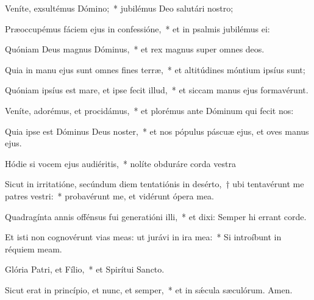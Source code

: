 \item Veníte, exsultémus Dómino;~* jubilémus Deo salutári nostro;

\item Præoccupémus fáciem ejus in confessióne,~* et in psalmis jubilémus ei: 

\item Quóniam Deus magnus Dóminus,~* et rex magnus super omnes deos.

\item Quia in manu ejus sunt omnes fines terræ,~* et altitúdines móntium ipsíus sunt; 

\item Quóniam ipsíus est mare, et ipse fecit illud,~* et siccam manus ejus formavérunt.

\item Veníte, adorémus, et procidámus,~* et plorémus ante Dóminum qui fecit nos:

\item Quia ipse est Dóminus Deus noster,~* et nos pópulus páscuæ ejus, et oves manus ejus. 

\item Hódie si vocem ejus audiéritis,~* nolíte obduráre corda vestra

\item Sicut in irritatióne, secúndum diem tentatiónis in desérto,~† ubi tentavérunt me patres vestri:~* probavérunt me, et vidérunt ópera mea. 

\item Quadragínta annis offénsus fui generatióni illi,~* et dixi: Semper hi errant corde.

\item Et isti non cognovérunt vias meas: ut jurávi in ira mea:~* Si introíbunt in réquiem meam. 

\item Glória Patri, et Fílio,~* et Spirítui Sancto.

\item Sicut erat in princípio, et nunc, et semper,~* et in sǽcula sæculórum. Amen.

